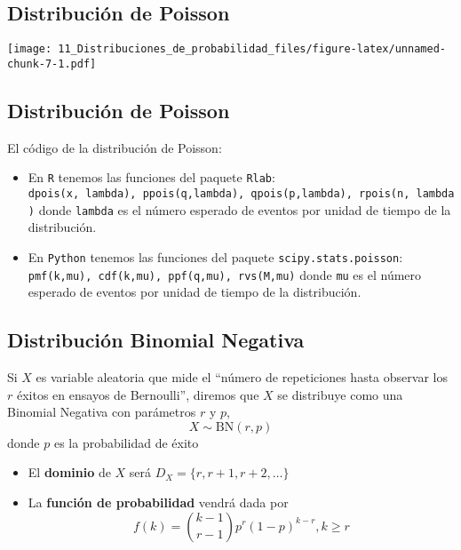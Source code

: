 \documentclass[
]{article}
\providecommand{\tightlist}{%
  \setlength{\itemsep}{0pt}\setlength{\parskip}{0pt}}
\begin{document}
\hypertarget{distribuciuxf3n-de-poisson-2}{%
\subsection{Distribución de
Poisson}\label{distribuciuxf3n-de-poisson-2}}

\texttt{[image: 11\_Distribuciones\_de\_probabilidad\_files/figure-latex/unnamed-chunk-7-1.pdf]}

\hypertarget{distribuciuxf3n-de-poisson-3}{%
\subsection{Distribución de
Poisson}\label{distribuciuxf3n-de-poisson-3}}

El código de la distribución de Poisson:

\begin{itemize}
\tightlist
\item
  En \texttt{R} tenemos las funciones del paquete \texttt{Rlab}:
  \texttt{dpois(x,\ lambda),\ ppois(q,lambda),\ qpois(p,lambda),\ rpois(n,\ lambda)}
  donde \texttt{lambda} es el número esperado de eventos por unidad de
  tiempo de la distribución.
\item
  En \texttt{Python} tenemos las funciones del paquete
  \texttt{scipy.stats.poisson}:
  \texttt{pmf(k,mu),\ cdf(k,mu),\ ppf(q,mu),\ rvs(M,mu)} donde
  \texttt{mu} es el número esperado de eventos por unidad de tiempo de
  la distribución.
\end{itemize}

\hypertarget{distribuciuxf3n-binomial-negativa}{%
\subsection{Distribución Binomial
Negativa}\label{distribuciuxf3n-binomial-negativa}}

Si \(X\) es variable aleatoria que mide el ``número de repeticiones
hasta observar los \(r\) éxitos en ensayos de Bernoulli'', diremos que
\(X\) se distribuye como una Binomial Negativa con parámetros \(r\) y
\(p\), \[X\sim\text{BN}(r,p)\] donde \(p\) es la probabilidad de éxito

\begin{itemize}
\tightlist
\item
  El \textbf{dominio} de \(X\) será \(D_X = \{r, r+1, r+2,\dots\}\)
\item
  La \textbf{función de probabilidad} vendrá dada por
  \[f(k) = {k-1\choose r-1}p^r(1-p)^{k-r}, k\geq r\]
\end{itemize}
\end{document}
